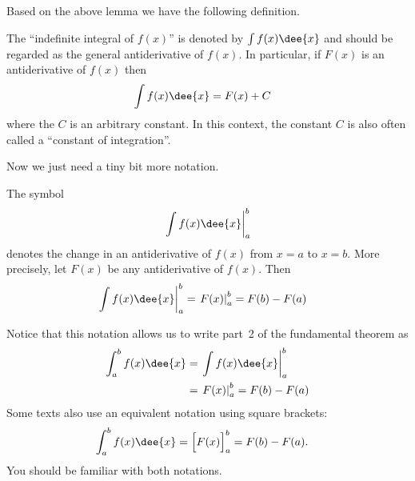Based on the above lemma we have the following definition.
\begin{defn}\label{def:INTindefintegral}
The ``indefinite integral of $f(x)$'' is denoted by $\int f(x)\dee{x}$
and should be regarded as the general antiderivative of $f(x)$. In particular, if $F(x)$
is an antiderivative of $f(x)$ then
\begin{align*}
  \int f(x)\dee{x} &= F(x) + C
\end{align*}
where the $C$ is an arbitrary constant. In this context, the constant $C$ is also
often called a ``constant of integration''.
\end{defn}
Now we just need a tiny bit more notation.
\begin{notn}
The symbol
\begin{align*}
\left.\int f(x)\dee{x} \right|_{a}^{b}
\end{align*}
denotes the change in an antiderivative of $f(x)$ from $x=a$ to $x=b$. More precisely,
let $F(x)$ be any antiderivative of $f(x)$. Then
\begin{align*}
\left.\int f(x)\dee{x} \right|_{a}^{b}
  &= \left.F(x)\right|_a^b = F(b) - F(a)
\end{align*}
\end{notn}
Notice that this notation allows us to write part~2 of the fundamental theorem as
\begin{align*}
  \int_a^b f(x)\dee{x} &= \left.\int f(x)\dee{x} \right|_{a}^{b} \\
  &= \left.F(x)\right|_a^b = F(b) - F(a)
\end{align*}
Some texts also use an equivalent notation using square brackets:
\begin{align*}
  \int_a^b f(x)\dee{x} &= \Big[F(x)\Big]_a^b = F(b) - F(a).
\end{align*}
You should be familiar with both notations.


